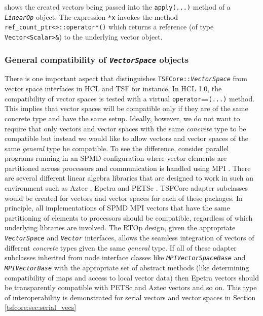shows the created vectors being passed into the \texttt{apply(\-...)}
method of a \texttt{\textit{LinearOp}} object.  The expression
\texttt{*x} invokes the method
\texttt{ref\_count\_ptr<>\-::operator*()} which returns a reference
(of type \texttt{Vector<Scalar>\&}) to the underlying vector object.

%
\subsubsection{General compatibility of \texttt{\textit{VectorSpace}} objects}
\label{tsfcore:sec:vec_spc_compatibility}
%

There is one important aspect that distinguishes
\texttt{TSFCore\-::\textit{VectorSpace}} from vector space interfaces in
HCL and TSF for instance.  In HCL 1.0, the compatibility of vector
spaces is tested with a virtual \texttt{operator==(...)}  method.
This implies that vector spaces will be compatible only if they are of
the same concrete type and have the same setup.  Ideally, however, we
do not want to require that only vectors and vector spaces with the
same {\em concrete} type to be compatible but instead we would like to
allow vectors and vector spaces of the same {\em general} type be
compatible.  To see the difference, consider parallel programs running
in an SPMD configuration where vector elements are partitioned across
processors and communication is handled using MPI
\cite{ref:mpi}.  There are several different linear algebra libraries
that are designed to work in such an environment such as Aztec
\cite{sd:aztec}, Epetra \cite{ref:Epetra} and PETSc \cite{ref:petsc}.  TSFCore
adapter subclasses would be created for vectors and vector spaces for
each of these packages.  In principle, all implementations of SPMD MPI
vectors that have the same partitioning of elements to processors
should be compatible, regardless of which underlying libraries
are involved.  The RTOp design, given the appropriate
\texttt{\textit{VectorSpace}} and \texttt{\textit{Vector}} interfaces,
allows the seamless integration of vectors of different {\em concrete}
types given the same {\em general} type.  If all of these adapter
subclasses inherited from node interface classes like
\texttt{\textit{MPIVectorSpaceBase}} and
\texttt{\textit{MPIVectorBase}} with the appropriate set of abstract
methods (like determining compatibility of maps and access to local
vector data) then Epetra vectors should be transparently compatible
with PETSc and Aztec vectors and so on.  This type of interoperability
is demonstrated for serial vectors and vector spaces in Section
\ref{tsfcore:sec:serial_vecs}

